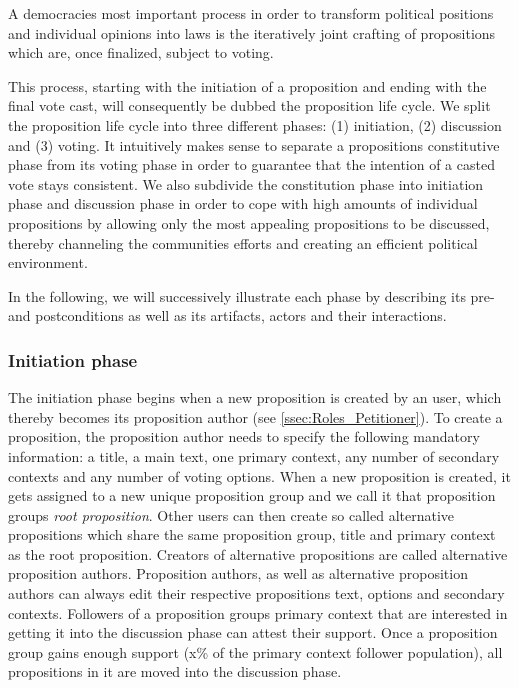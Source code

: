 A democracies most important process in order to transform political positions and individual opinions into laws is the iteratively joint crafting of propositions which are, once finalized, subject to voting.

This process, starting with the initiation of a proposition and ending with the final vote cast, will consequently be dubbed the proposition life cycle.
We split the proposition life cycle into three different phases: (1) initiation, (2) discussion and (3) voting.
It intuitively makes sense to separate a propositions constitutive phase from its voting phase in order to guarantee that the intention of a casted vote stays consistent.
We also subdivide the constitution phase into initiation phase and discussion phase in order to cope with high amounts of individual propositions by allowing only the most appealing propositions to be discussed, thereby channeling the communities efforts and creating an efficient political environment.

In the following, we will successively illustrate each phase by describing its pre- and postconditions as well as its artifacts, actors and their interactions.

\subsubsection{Initiation phase}
\label{ssec:Lifecycle_Initiation}

The initiation phase begins when a new proposition is created by an user, which thereby becomes its proposition author (see \ref{ssec:Roles_Petitioner}).
To create a proposition, the proposition author needs to specify the following mandatory information: a title, a main text, one primary context, any number of secondary contexts and any number of voting options.
When a new proposition is created, it gets assigned to a new unique proposition group and we call it that proposition groups \emph{root proposition}.
Other users can then create so called alternative propositions which share the same proposition group, title and primary context as the root proposition.
Creators of alternative propositions are called alternative proposition authors.
Proposition authors, as well as alternative proposition authors can always edit their respective propositions text, options and secondary contexts.
Followers of a proposition groups primary context that are interested in getting it into the discussion phase can attest their support.
Once a proposition group gains enough support (x\% of the primary context follower population), all propositions in it are moved into the discussion phase.


